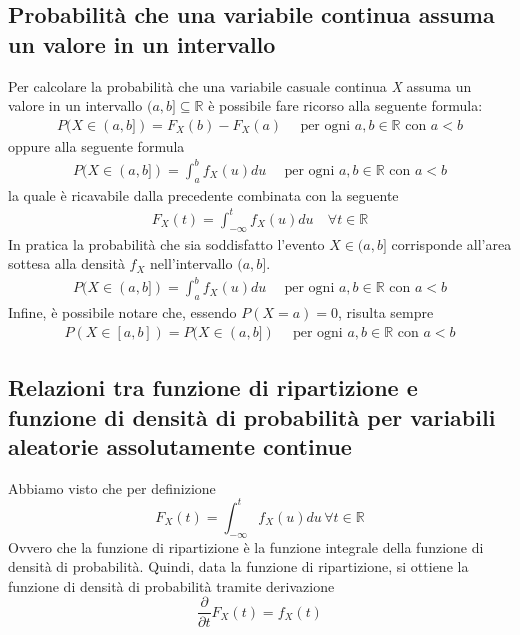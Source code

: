 \subsection{Probabilità che una variabile continua assuma un valore in un intervallo}
Per calcolare la probabilità che una variabile casuale continua \textit{X} assuma un valore in un intervallo $(a, b] \subseteq \mathbb{R}$ è possibile fare ricorso alla seguente formula:
\begin{align*}
	P(X \in (a, b]) = F_X(b) - F_X(a) & \, \text{ per ogni } a, b \in \mathbb{R} \text{ con } a < b
\end{align*}
oppure alla seguente formula
\begin{align*}
	P(X \in (a, b]) = \int_{a}^{b} f_X(u)du & \, \text{ per ogni } a, b \in \mathbb{R} \text{ con } a < b
\end{align*}
la quale è ricavabile dalla precedente combinata con la seguente
\begin{align*}
F_X(t) = \int_{-\infty}^{t}f_X(u)du & \ \forall t \in \mathbb{R}
\end{align*}
In pratica la probabilità che sia soddisfatto l'evento $X \in (a, b]$ corrisponde all'area sottesa alla densità $f_X$ nell'intervallo $(a,b]$.
\begin{align*}
P(X \in (a, b]) = \int_{a}^{b}f_X(u)du & \, \text{ per ogni } a, b \in \mathbb{R} \text{ con } a < b
\end{align*}
Infine, è possibile notare che, essendo $P(X = a) = 0$, risulta sempre
\begin{align}
	P(X \in [a, b]) = P(X \in (a, b]) & \, \text{ per ogni } a, b \in \mathbb{R} \text{ con } a < b
\end{align}

\subsection{Relazioni tra funzione di ripartizione e funzione di densità di probabilità per variabili aleatorie assolutamente continue}

Abbiamo visto che per definizione
\begin{equation}
F_X(t) = \int_{-\infty}^{t} f_X(u) du \, \forall t \in \mathbb{R}
\end{equation}
Ovvero che la funzione di ripartizione è la funzione integrale della funzione di densità di probabilità.
Quindi, data la funzione di ripartizione, si ottiene la funzione di densità di probabilità tramite derivazione
\begin{equation}
	\frac{\partial}{\partial t}F_X(t) = f_X(t)
\end{equation}

